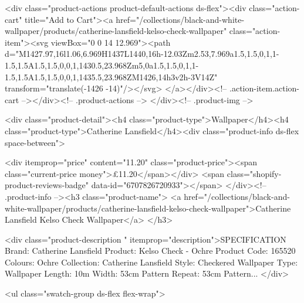 {{{{{{{<div class="product-actions product-default-actions ds-flex"><div class="action-cart" title="Add to Cart"><a href="/collections/black-and-white-wallpaper/products/catherine-lansfield-kelso-check-wallpaper" class="action-item"><svg viewBox="0 0 14 12.969"><path d="M1427.97,16l1.06,6.969H1437L1440,16h-12.03Zm2.53,7.969a1.5,1.5,0,1,1-1.5,1.5A1.5,1.5,0,0,1,1430.5,23.968Zm5,0a1.5,1.5,0,1,1-1.5,1.5A1.5,1.5,0,0,1,1435.5,23.968ZM1426,14h3v2h-3V14Z" transform="translate(-1426 -14)"/></svg>
</a></div><!-- .action-item.action-cart --></div><!-- .product-actions -->
</div><!-- .product-img -->

<div class="product-detail"><h4 class="product-type">Wallpaper</h4><h4 class="product-type">Catherine Lansfield</h4><div class="product-info ds-flex space-between">
    
<div itemprop="price" content="11.20" class="product-price"><span class="current-price money">£11.20</span></div>
    <span class="shopify-product-reviews-badge" data-id="6707826720933"></span>
  </div><!-- .product-info --><h3 class="product-name">
      <a href="/collections/black-and-white-wallpaper/products/catherine-lansfield-kelso-check-wallpaper">Catherine Lansfield Kelso Check Wallpaper</a>
    </h3>
    
<div class="product-description " itemprop="description">SPECIFICATION Brand: Catherine Lansfield Product: Kelso Check - Ochre Product Code: 165520 Colours: Ochre Collection: Catherine Lansfield Style: Checkered Wallpaper Type: Wallpaper Length: 10m Width: 53cm Pattern Repeat: 53cm Pattern...
</div>



<ul class="swatch-group ds-flex flex-wrap">
        
}}}}}}}
